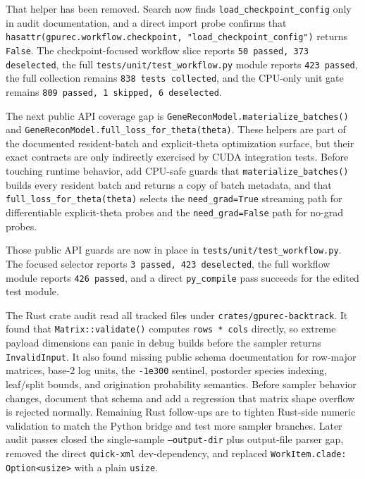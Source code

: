 \documentclass[11pt]{article}
\begin{document}
That helper has been removed.  Search now finds
\texttt{load\_checkpoint\_config} only in audit documentation, and a direct
import probe confirms that
\texttt{hasattr(gpurec.workflow.checkpoint, "load\_checkpoint\_config")}
returns \texttt{False}.  The checkpoint-focused workflow slice reports
\texttt{50 passed, 373 deselected}, the full
\texttt{tests/unit/test\_workflow.py} module reports \texttt{423 passed}, the
full collection remains \texttt{838 tests collected}, and the CPU-only unit
gate remains \texttt{809 passed, 1 skipped, 6 deselected}.

The next public API coverage gap is
\texttt{GeneReconModel.materialize\_batches()} and
\texttt{GeneReconModel.full\_loss\_for\_theta(theta)}.  These helpers are part
of the documented resident-batch and explicit-theta optimization surface, but
their exact contracts are only indirectly exercised by CUDA integration tests.
Before touching runtime behavior, add CPU-safe guards that
\texttt{materialize\_batches()} builds every resident batch and returns a copy of
batch metadata, and that \texttt{full\_loss\_for\_theta(theta)} selects the
\texttt{need\_grad=True} streaming path for differentiable explicit-theta probes
and the \texttt{need\_grad=False} path for no-grad probes.

Those public API guards are now in place in
\texttt{tests/unit/test\_workflow.py}.  The focused selector reports
\texttt{3 passed, 423 deselected}, the full workflow module reports
\texttt{426 passed}, and a direct \texttt{py\_compile} pass succeeds for the
edited test module.

The Rust crate audit read all tracked files under
\texttt{crates/gpurec-backtrack}.  It found that
\texttt{Matrix::validate()} computes \texttt{rows * cols} directly, so extreme
payload dimensions can panic in debug builds before the sampler returns
\texttt{InvalidInput}.  It also found missing public schema documentation for
row-major matrices, base-2 log units, the \texttt{-1e300} sentinel, postorder
species indexing, leaf/split bounds, and origination probability semantics.
Before sampler behavior changes, document that schema and add a regression that
matrix shape overflow is rejected normally.  Remaining Rust follow-ups are to
tighten Rust-side numeric validation to match the Python bridge and test more
sampler branches.  Later audit passes closed the single-sample
\texttt{--output-dir} plus output-file parser gap, removed the direct
\texttt{quick-xml} dev-dependency, and replaced
\texttt{WorkItem.clade: Option<usize>} with a plain \texttt{usize}.
\end{document}
